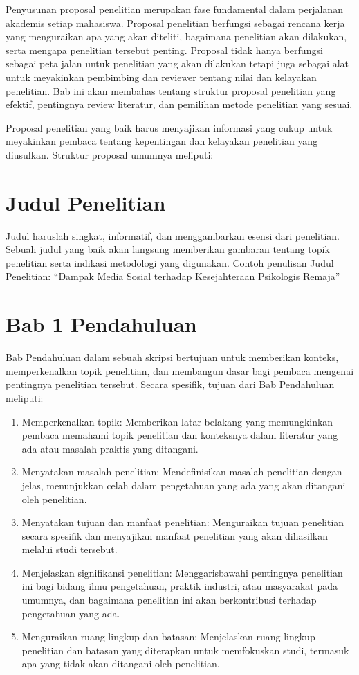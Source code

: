 \documentclass[
  indonesian,
  letterpaper,
]{scrbook}
\providecommand{\tightlist}{%
  \setlength{\itemsep}{0pt}\setlength{\parskip}{0pt}}
\begin{document}
Penyusunan proposal penelitian merupakan fase fundamental dalam
perjalanan akademis setiap mahasiswa. Proposal penelitian berfungsi
sebagai rencana kerja yang menguraikan apa yang akan diteliti, bagaimana
penelitian akan dilakukan, serta mengapa penelitian tersebut penting.
Proposal tidak hanya berfungsi sebagai peta jalan untuk penelitian yang
akan dilakukan tetapi juga sebagai alat untuk meyakinkan pembimbing dan
reviewer tentang nilai dan kelayakan penelitian. Bab ini akan membahas
tentang struktur proposal penelitian yang efektif, pentingnya review
literatur, dan pemilihan metode penelitian yang sesuai.

Proposal penelitian yang baik harus menyajikan informasi yang cukup
untuk meyakinkan pembaca tentang kepentingan dan kelayakan penelitian
yang diusulkan. Struktur proposal umumnya meliputi:

\section{Judul Penelitian}\label{judul-penelitian}

Judul haruslah singkat, informatif, dan menggambarkan esensi dari
penelitian. Sebuah judul yang baik akan langsung memberikan gambaran
tentang topik penelitian serta indikasi metodologi yang digunakan.
Contoh penulisan Judul Penelitian: ``Dampak Media Sosial terhadap
Kesejahteraan Psikologis Remaja''

\section{Bab 1 Pendahuluan}\label{bab-1-pendahuluan}

Bab Pendahuluan dalam sebuah skripsi bertujuan untuk memberikan konteks,
memperkenalkan topik penelitian, dan membangun dasar bagi pembaca
mengenai pentingnya penelitian tersebut. Secara spesifik, tujuan dari
Bab Pendahuluan meliputi:

\begin{enumerate}
\def\labelenumi{\arabic{enumi}.}
\tightlist
\item
  Memperkenalkan topik: Memberikan latar belakang yang memungkinkan
  pembaca memahami topik penelitian dan konteksnya dalam literatur yang
  ada atau masalah praktis yang ditangani.
\item
  Menyatakan masalah penelitian: Mendefinisikan masalah penelitian
  dengan jelas, menunjukkan celah dalam pengetahuan yang ada yang akan
  ditangani oleh penelitian.
\item
  Menyatakan tujuan dan manfaat penelitian: Menguraikan tujuan
  penelitian secara spesifik dan menyajikan manfaat penelitian yang akan
  dihasilkan melalui studi tersebut.
\item
  Menjelaskan signifikansi penelitian: Menggarisbawahi pentingnya
  penelitian ini bagi bidang ilmu pengetahuan, praktik industri, atau
  masyarakat pada umumnya, dan bagaimana penelitian ini akan
  berkontribusi terhadap pengetahuan yang ada.
\item
  Menguraikan ruang lingkup dan batasan: Menjelaskan ruang lingkup
  penelitian dan batasan yang diterapkan untuk memfokuskan studi,
  termasuk apa yang tidak akan ditangani oleh penelitian.
\end{enumerate}
\end{document}
